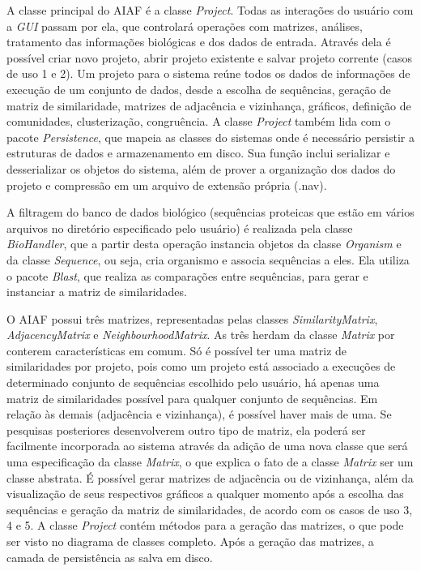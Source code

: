 A classe principal do AIAF é a classe \textit{Project}. Todas as interações do usuário com a \textit{GUI} passam por ela, que controlará operações com
matrizes, análises, tratamento das informações biológicas e dos dados de entrada. Através dela é possível criar novo projeto, abrir projeto existente e
salvar projeto corrente (casos de uso 1 e 2). Um projeto para o sistema reúne todos os dados de informações de execução de um conjunto de dados, desde
a escolha de sequências, geração de matriz de similaridade, matrizes de adjacência e vizinhança, gráficos, definição de comunidades, clusterização,
congruência. A classe \textit{Project} também lida com o pacote \textit{Persistence}, que mapeia as classes do sistemas onde é necessário
persistir a estruturas de dados e armazenamento em disco. Sua função inclui serializar e desserializar os objetos do sistema, além de prover
a organização dos dados do projeto e compressão em um arquivo de extensão própria (.nav).


A filtragem do banco de dados biológico (sequências proteicas que estão em vários arquivos no diretório especificado pelo usuário) é realizada pela classe
\textit{BioHandler}, que a partir desta operação instancia objetos da classe \textit{Organism} e da classe \textit{Sequence}, ou seja, cria organismo e associa
sequências a eles. Ela utiliza o pacote \textit{Blast}, que realiza as comparações entre sequências, para gerar e instanciar a matriz de similaridades.

O AIAF possui três matrizes, representadas pelas classes \textit{SimilarityMatrix}, \textit{AdjacencyMatrix} e \textit{NeighbourhoodMatrix}. As três herdam
da classe \textit{Matrix} por conterem características em comum. Só é possível ter uma matriz de similaridades por projeto, pois como um projeto está associado
a execuções de determinado conjunto de sequências escolhido pelo usuário, há apenas uma matriz de similaridades possível para qualquer conjunto de sequências.
Em relação às demais (adjacência e vizinhança), é possível haver mais de uma. Se pesquisas posteriores desenvolverem outro tipo de matriz, ela poderá ser
facilmente incorporada ao sistema através da adição de uma nova classe que será uma especificação da classe \textit{Matrix}, o que explica o fato de a classe
\textit{Matrix} ser um classe abstrata. É possível gerar matrizes de adjacência ou de vizinhança, além da visualização de seus respectivos gráficos a qualquer
momento após a escolha das sequências e geração da matriz de similaridades, de acordo com os casos de uso 3, 4 e 5. A classe \textit{Project} contém métodos
para a geração das matrizes, o que pode ser visto no diagrama de classes completo. Após a geração das matrizes, a camada de persistência as salva em disco.

